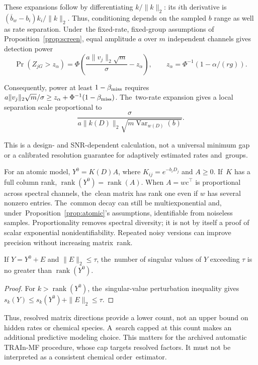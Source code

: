 \documentclass[mathematics,article,accept,moreauthors]{Definitions/mdpi}
\newcommand{\rank}{\operatorname{rank}}
\begin{document}
These expansions follow by differentiating $k/\|k\|_2$: its $i$th derivative is $(\overline b_w-b_i)k_i/\|k\|_2$. Thus, conditioning depends on the sampled $b$ range as well as rate separation. Under~the fixed-rate, fixed-group assumptions of Proposition~\ref{prop:screen}, equal amplitude $a$ over $m$ independent channels gives detection power
\[
 \Pr(Z_{jG}>z_\alpha)=
 \Phi\!\left(\frac{a\|v_j\|_2\sqrt m}{\sigma}-z_\alpha\right),
 \qquad z_\alpha=\Phi^{-1}(1-\alpha/(rg)).
\]

Consequently, power at least $1-\beta_{\rm miss}$ requires $a\|v_j\|_2\sqrt m/\sigma\geq z_\alpha+\Phi^{-1}(1-\beta_{\rm miss})$. The~two-rate expansion gives a local separation scale proportional to
\[
 \frac{\sigma}{a\|k(D)\|_2\sqrt{m\operatorname{Var}_{w(D)}(b)}}.
\]

This is a design- and SNR-dependent calculation, not a universal minimum gap or a calibrated resolution guarantee for adaptively estimated rates and~groups.

For an atomic model, $Y^0=K(D)A$, where $K_{ij}=e^{-b_iD_j}$ and $A\geq0$. If~$K$ has a full column rank, $\rank(Y^0)=\rank(A)$. When $A=wc^\top$ is proportional across spectral channels, the~clean matrix has rank one even if $w$ has several nonzero entries. The~common decay can still be multiexponential and, under~Proposition~\ref{prop:atomic}'s assumptions, identifiable from noiseless samples. Proportionality removes spectral diversity; it is not by itself a proof of scalar exponential nonidentifiability. Repeated noisy versions can improve precision without increasing matrix~rank.

\begin{Proposition}\label{prop:rank}
If $Y=Y^0+E$ and $\|E\|_2\leq\tau$, the~number of singular values of $Y$ exceeding $\tau$ is no greater than $\rank(Y^0)$.
\end{Proposition}
\begin{proof}
For $k>\rank(Y^0)$, the~singular-value perturbation inequality gives $s_k(Y)\leq s_k(Y^0)+\|E\|_2\leq\tau$.
\end{proof}

Thus, resolved matrix directions provide a lower count, not an upper bound on hidden rates or chemical species. A~search capped at this count makes an additional predictive modeling choice. This matters for the archived automatic TRAIn-MF procedure, whose cap targets resolved factors. It must not be interpreted as a consistent chemical order~estimator.
\end{document}
